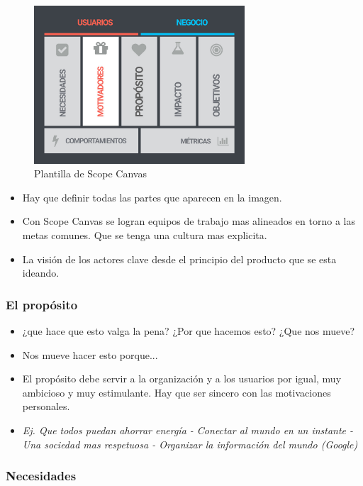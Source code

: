 \documentclass[titlepage,a4paper]{article}
\begin{document}
\begin{figure}[!htb]
    \centering
    \includegraphics[width=0.7\textwidth]{Imagenes/ScopeCanvas.jpg}
    \caption{Plantilla de Scope Canvas}
\end{figure}



\begin{itemize}
    \item Hay que definir todas las partes que aparecen en la imagen.
    \item Con Scope Canvas se logran equipos de trabajo mas alineados en torno a las metas comunes. Que se tenga una cultura mas explicita.
    \item La visión de los actores clave desde el principio del producto que se esta ideando.
\end{itemize}


\subsubsection*{El propósito}

\begin{itemize}
    \item ¿que hace que esto valga la pena? ¿Por que hacemos esto? ¿Que nos mueve?
    \item Nos mueve hacer esto porque...
    \item El propósito debe servir a la organización y a los usuarios por igual, muy ambicioso y muy estimulante. Hay que ser sincero con las motivaciones personales.
    \item \textit{Ej. Que todos puedan ahorrar energía - Conectar al mundo en un instante - Una sociedad mas respetuosa - Organizar la información del mundo (Google)}
\end{itemize}

\subsubsection*{Necesidades}
\end{document}
